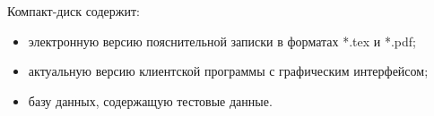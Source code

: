 \newpage
\renewcommand{\refname}{Список использованных источников}


Компакт-диск содержит: 
\begin{itemize}
\item электронную версию пояснительной записки в форматах *.tex и *.pdf;
\item актуальную версию клиентской программы с графическим интерфейсом;
\item базу данных, содержащую тестовые данные.
\end{itemize}


